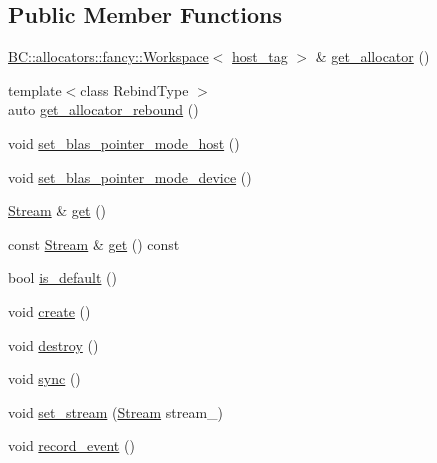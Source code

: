 \subsection*{Public Member Functions}
\begin{DoxyCompactItemize}
\item 
\hyperlink{classBC_1_1allocators_1_1fancy_1_1Workspace}{B\+C\+::allocators\+::fancy\+::\+Workspace}$<$ \hyperlink{structBC_1_1host__tag}{host\+\_\+tag} $>$ \& \hyperlink{classBC_1_1streams_1_1Stream_3_01host__tag_01_4_aa2128be2980a977d23c611dc5ab05f9a}{get\+\_\+allocator} ()
\item 
{\footnotesize template$<$class Rebind\+Type $>$ }\\auto \hyperlink{classBC_1_1streams_1_1Stream_3_01host__tag_01_4_ac3b754c41c79b6b12fd8d96cb7e055f6}{get\+\_\+allocator\+\_\+rebound} ()
\item 
void \hyperlink{classBC_1_1streams_1_1Stream_3_01host__tag_01_4_a57251588f9a1de655d373f771a628ca7}{set\+\_\+blas\+\_\+pointer\+\_\+mode\+\_\+host} ()
\item 
void \hyperlink{classBC_1_1streams_1_1Stream_3_01host__tag_01_4_a419bd7538bd962ed8a58611bcb8421eb}{set\+\_\+blas\+\_\+pointer\+\_\+mode\+\_\+device} ()
\item 
\hyperlink{classBC_1_1streams_1_1Stream}{Stream} \& \hyperlink{classBC_1_1streams_1_1Stream_3_01host__tag_01_4_a6eb91af294e9d53a2d11b9bacc425894}{get} ()
\item 
const \hyperlink{classBC_1_1streams_1_1Stream}{Stream} \& \hyperlink{classBC_1_1streams_1_1Stream_3_01host__tag_01_4_a4fb196a07546a936ce8c46292de8b092}{get} () const 
\item 
bool \hyperlink{classBC_1_1streams_1_1Stream_3_01host__tag_01_4_ad2025b181ad0b4c28579f2b8dcbff8a6}{is\+\_\+default} ()
\item 
void \hyperlink{classBC_1_1streams_1_1Stream_3_01host__tag_01_4_a3259b40d43de759a0de96f0a2aa785a7}{create} ()
\item 
void \hyperlink{classBC_1_1streams_1_1Stream_3_01host__tag_01_4_aefbc2366807038166de922fd56854ac1}{destroy} ()
\item 
void \hyperlink{classBC_1_1streams_1_1Stream_3_01host__tag_01_4_a7ccf641e994784df586ae7836ef9b982}{sync} ()
\item 
void \hyperlink{classBC_1_1streams_1_1Stream_3_01host__tag_01_4_aa22c51636069ebcb97d5bd1d261662d5}{set\+\_\+stream} (\hyperlink{classBC_1_1streams_1_1Stream}{Stream} stream\+\_\+)
\item 
void \hyperlink{classBC_1_1streams_1_1Stream_3_01host__tag_01_4_a62f21931a6053cf94e269d1c8b39dd78}{record\+\_\+event} ()

\end{DoxyCompactItemize}
